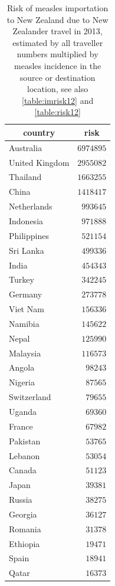 \documentclass{article}
\begin{document}
\begin{table}
\begin{center}
\begin{tabular}{lr}
\hline\hline
\multicolumn{1}{c}{country}&\multicolumn{1}{c}{risk}\tabularnewline
\hline
Australia&$6974895$\tabularnewline
United Kingdom&$2955082$\tabularnewline
Thailand&$1663255$\tabularnewline
China&$1418417$\tabularnewline
Netherlands&$ 993645$\tabularnewline
Indonesia&$ 971888$\tabularnewline
Philippines&$ 521154$\tabularnewline
Sri Lanka&$ 499336$\tabularnewline
India&$ 454343$\tabularnewline
Turkey&$ 342245$\tabularnewline
Germany&$ 273778$\tabularnewline
Viet Nam&$ 156336$\tabularnewline
Namibia&$ 145622$\tabularnewline
Nepal&$ 125990$\tabularnewline
Malaysia&$ 116573$\tabularnewline
Angola&$  98243$\tabularnewline
Nigeria&$  87565$\tabularnewline
Switzerland&$  79655$\tabularnewline
Uganda&$  69360$\tabularnewline
France&$  67982$\tabularnewline
Pakistan&$  53765$\tabularnewline
Lebanon&$  53054$\tabularnewline
Canada&$  51123$\tabularnewline
Japan&$  39381$\tabularnewline
Russia&$  38275$\tabularnewline
Georgia&$  36127$\tabularnewline
Romania&$  31378$\tabularnewline
Ethiopia&$  19471$\tabularnewline
Spain&$  18941$\tabularnewline
Qatar&$  16373$\tabularnewline
\hline
\end{tabular}\end{center}\caption{Risk of measles importation to New Zealand due to New Zealander travel in 2013, estimated by all traveller numbers multiplied by measles incidence in the source or destination location, see also \autoref{table:imrisk12} and \autoref{table:risk12}}
\label{table:nzrisk12}
\end{table}
\end{document}
